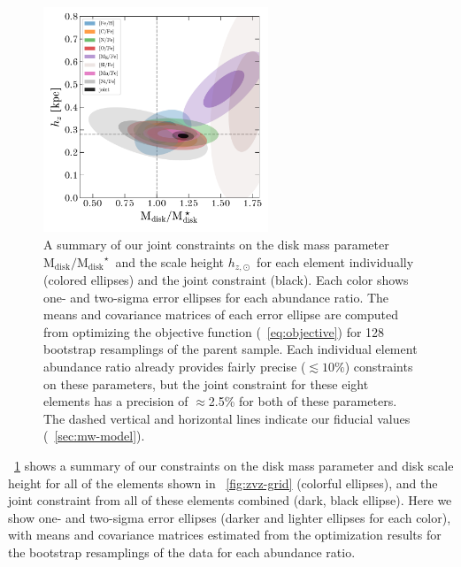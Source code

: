 \documentclass[modern]{aastex63}
\newcommand{\mdisk}{\ensuremath{\mathrm{M}_\mathrm{disk}}}
\newcommand{\mratio}{\ensuremath{\mdisk / \mdisk^\star}}
\newcommand{\hz}{\ensuremath{h_{z, \odot}}}
\begin{document}
\begin{figure}[!tp]
  \begin{mdframed}
    \color{captiongray}
  \begin{center}
  \includegraphics[width=0.6\textwidth]{M-hz-error-ellipses.pdf}
  \end{center}
  \caption{%
    A summary of our joint constraints on the disk mass parameter \mratio\ and
    the scale height \hz\ for each element individually (colored ellipses) and
    the joint constraint (black).
    Each color shows one- and two-sigma error ellipses for each abundance ratio.
    The means and covariance matrices of each error ellipse are computed from
    optimizing the objective function (\equationname~\ref{eq:objective}) for 128
    bootstrap resamplings of the parent sample.
    Each individual element abundance ratio already provides fairly precise
    ($\lesssim10\%$) constraints on these parameters, but the joint constraint
    for these eight elements has a precision of $\approx$2.5\% for both of these
    parameters.
    The dashed vertical and horizontal lines indicate our fiducial values
    (\sectionname~\ref{sec:mw-model}).
  \label{fig:elem-ellipses-1}
  }
  \end{mdframed}
\end{figure}

\figurename~\ref{fig:elem-ellipses-1} shows a summary of our constraints on the
disk mass parameter and disk scale height for all of the elements shown in
\figurename~\ref{fig:zvz-grid} (colorful ellipses), and the joint constraint
from all of these elements combined (dark, black ellipse).
Here we show one- and two-sigma error ellipses (darker and lighter ellipses for
each color), with means and covariance matrices estimated from the optimization
results for the bootstrap resamplings of the data for each abundance ratio.
\end{document}
